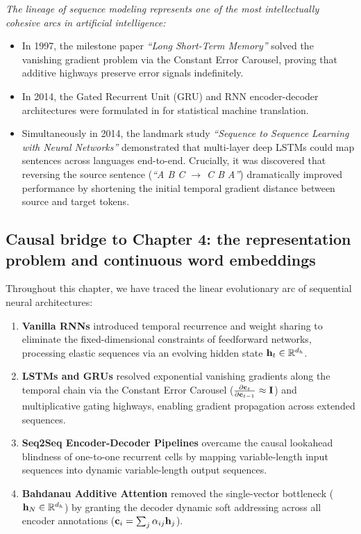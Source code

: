 \documentclass[../../main.tex]{subfiles}
\begin{document}
\textit{The lineage of sequence modeling represents one of the most intellectually cohesive arcs in artificial intelligence:}
\begin{itemize}
    \item In 1997, the milestone paper \textit{``Long Short-Term Memory''} \cite{hochreiter1997} solved the vanishing gradient problem via the Constant Error Carousel, proving that additive highways preserve error signals indefinitely.
    \item In 2014, the Gated Recurrent Unit (GRU) and RNN encoder-decoder architectures were formulated in \cite{cho2014} for statistical machine translation.
    \item Simultaneously in 2014, the landmark study \textit{``Sequence to Sequence Learning with Neural Networks''} \cite{sutskever2014} demonstrated that multi-layer deep LSTMs could map sentences across languages end-to-end. Crucially, it was discovered that reversing the source sentence (\textit{``A B C $\to$ C B A''}) dramatically improved performance by shortening the initial temporal gradient distance between source and target tokens.
\end{itemize}

\subsection{Causal bridge to Chapter 4: the representation problem and continuous word embeddings}
\label{subsec:bridge_to_chapter_4}

Throughout this chapter, we have traced the linear evolutionary arc of sequential neural architectures:
\begin{enumerate}
    \item \textbf{Vanilla RNNs} introduced temporal recurrence and weight sharing to eliminate the fixed-dimensional constraints of feedforward networks, processing elastic sequences via an evolving hidden state $\mathbf{h}_t \in \mathbb{R}^{d_h}$.
    \item \textbf{LSTMs and GRUs} resolved exponential vanishing gradients along the temporal chain via the Constant Error Carousel ($\frac{\partial \mathbf{c}_t}{\partial \mathbf{c}_{t-1}} \approx \mathbf{I}$) and multiplicative gating highways, enabling gradient propagation across extended sequences.
    \item \textbf{Seq2Seq Encoder-Decoder Pipelines} overcame the causal lookahead blindness of one-to-one recurrent cells by mapping variable-length input sequences into dynamic variable-length output sequences.
    \item \textbf{Bahdanau Additive Attention} removed the single-vector bottleneck ($\mathbf{h}_N \in \mathbb{R}^{d_h}$) by granting the decoder dynamic soft addressing across all encoder annotations ($\mathbf{c}_i = \sum_j \alpha_{ij} \mathbf{h}_j$).
\end{enumerate}
\end{document}

